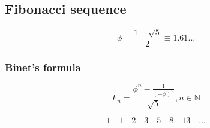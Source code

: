 \documentclass[12pt, a5paper]{article}
\begin{document}
\subsection*{Fibonacci sequence}

$$
\phi = \dfrac{1 + \sqrt{5}}{2} \equiv 1.61 \ldots
$$

\subsubsection*{Binet's formula}

$$
F_n = \dfrac{\phi^n - \frac{1}{(- \phi)^n}}{\sqrt{5}}, n \in \mathbb{N}
$$


$$
1 \quad 1 \quad 2 \quad 3 \quad 5 \quad 8 \quad 13 \quad \ldots
$$
\end{document}
